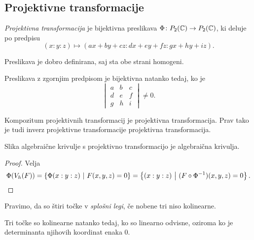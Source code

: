\newpage

\subsection{Projektivne transformacije}

\begin{definicija}
\emph{Projektivna transformacija} je bijektivna preslikava
$\Phi \colon P_2(\mathbb{C}) \to P_2(\mathbb{C})$, ki deluje po predpisu
\[
(x : y : z) \mapsto (ax + by + cz : dx + ey + fz : gx + hy + iz).
\]
\end{definicija}

\begin{opomba}
Preslikava je dobro definirana, saj sta obe strani homogeni.
\end{opomba}

\begin{trditev}
Preslikava z zgornjim predpisom je bijektivna natanko tedaj, ko je
\[
\begin{vmatrix}
a & b & c \\
d & e & f \\
g & h & i
\end{vmatrix}
\ne 0.
\]
\end{trditev}

\obvs

\begin{opomba}
Kompozitum projektivnih transformacij je projektivna
transformacija. Prav tako je tudi inverz projektivne transformacije
projektivna transformacija.
\end{opomba}

\begin{trditev}
Slika algebraične krivulje s projektivno transformacijo je
algebraična krivulja.
\end{trditev}

\begin{proof}
Velja
\[
\Phi(V_h(F)) =
\left\{\Phi(x : y : z)~\middle\vert~F(x, y, z) = 0\right\} =
\left\{(x : y : z)~\middle\vert~(F \circ \Phi^{-1})(x, y, z) = 0\right\}. \qedhere
\]
\end{proof}

\begin{definicija}
Pravimo, da so štiri točke v
\emph{splošni legi}, če
nobene tri niso kolinearne.
\end{definicija}

\begin{opomba}
Tri točke so kolinearne natanko tedaj, ko so linearno odvisne,
oziroma ko je determinanta njihovih koordinat enaka $0$.
\end{opomba}

